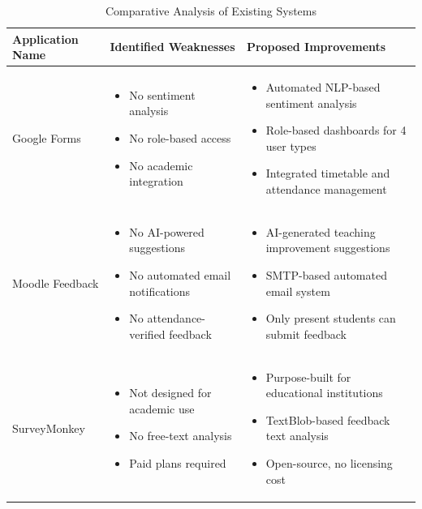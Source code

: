 \begin{table}[H]
\centering
\caption{Comparative Analysis of Existing Systems}
\renewcommand{\arraystretch}{1.3}

\begin{tabularx}{\textwidth}{|p{3cm}|X|X|}
\hline
\textbf{Application Name} & \textbf{Identified Weaknesses} & \textbf{Proposed Improvements} \\
\hline
Google Forms &
\begin{itemize}[leftmargin=*, noitemsep, topsep=0pt]
    \item No sentiment analysis
    \item No role-based access
    \item No academic integration
\end{itemize}
&
\begin{itemize}[leftmargin=*, noitemsep, topsep=0pt]
    \item Automated NLP-based sentiment analysis
    \item Role-based dashboards for 4 user types
    \item Integrated timetable and attendance management
\end{itemize}
\\
\hline
Moodle Feedback &
\begin{itemize}[leftmargin=*, noitemsep, topsep=0pt]
    \item No AI-powered suggestions
    \item No automated email notifications
    \item No attendance-verified feedback
\end{itemize}
&
\begin{itemize}[leftmargin=*, noitemsep, topsep=0pt]
    \item AI-generated teaching improvement suggestions
    \item SMTP-based automated email system
    \item Only present students can submit feedback
\end{itemize}
\\
\hline
SurveyMonkey &
\begin{itemize}[leftmargin=*, noitemsep, topsep=0pt]
    \item Not designed for academic use
    \item No free-text analysis
    \item Paid plans required
\end{itemize}
&
\begin{itemize}[leftmargin=*, noitemsep, topsep=0pt]
    \item Purpose-built for educational institutions
    \item TextBlob-based feedback text analysis
    \item Open-source, no licensing cost
\end{itemize}
\\
\hline

\end{tabularx}
\end{table}



